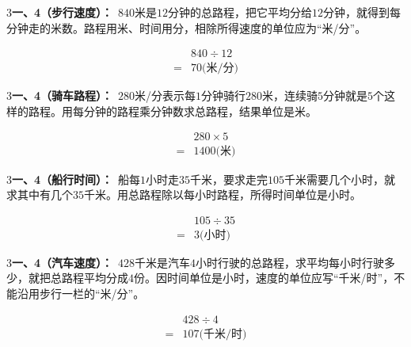 \documentclass[multi=snippet,border={5bp 20bp 5bp 5bp}]{standalone}
\newenvironment{snippet}[3]{\begin{minipage}{#1bp}\color{answerred}\fontsize{#2}{#3}\selectfont\raggedright}{\end{minipage}}
\begin{document}
\begin{snippet}{505}{11.5}{14}\begin{multicols}{3}\raggedcolumns \textbf{一、4（步行速度）：}\ \(840\)\allowbreak 米是\(12\)\allowbreak 分钟的总路程，把它平均分给\(12\)\allowbreak 分钟，就得到每分钟走的米数。路程用米、时间用分，相除所得速度的单位应为“米/分”。\par \[\begin{aligned}&840\div12\\={}&70\text{(米/分)}\end{aligned}\]\end{multicols}\end{snippet}
\begin{snippet}{505}{11.5}{14}\begin{multicols}{3}\raggedcolumns \textbf{一、4（骑车路程）：}\ \(280\)\allowbreak 米/分表示每\(1\)\allowbreak 分钟骑行\(280\)\allowbreak 米，连续骑\(5\)\allowbreak 分钟就是\(5\)\allowbreak 个这样的路程。用每分钟的路程乘分钟数求总路程，结果单位是米。\par \[\begin{aligned}&280\times5\\={}&1400\text{(米)}\end{aligned}\]\end{multicols}\end{snippet}
\begin{snippet}{505}{11.5}{14}\begin{multicols}{3}\raggedcolumns \textbf{一、4（船行时间）：}\ 船每\(1\)\allowbreak 小时走\(35\)\allowbreak 千米，要求走完\(105\)\allowbreak 千米需要几个小时，就求其中有几个\(35\)\allowbreak 千米。用总路程除以每小时路程，所得时间单位是小时。\par \[\begin{aligned}&105\div35\\={}&3\text{(小时)}\end{aligned}\]\end{multicols}\end{snippet}
\begin{snippet}{505}{11.5}{14}\begin{multicols}{3}\raggedcolumns \textbf{一、4（汽车速度）：}\ \(428\)\allowbreak 千米是汽车\(4\)\allowbreak 小时行驶的总路程，求平均每小时行驶多少，就把总路程平均分成\(4\)\allowbreak 份。因时间单位是小时，速度的单位应写“千米/时”，不能沿用步行一栏的“米/分”。\par \[\begin{aligned}&428\div4\\={}&107\text{(千米/时)}\end{aligned}\]\end{multicols}\end{snippet}
\end{document}
